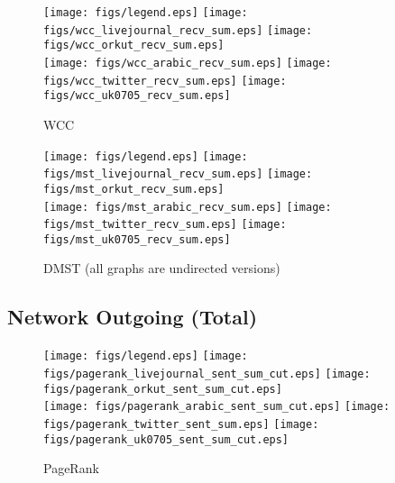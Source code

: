\documentclass{article}
\newcommand{\bline}[1][1]{\vspace{#1\baselineskip}}
\begin{document}
\begin{figure}[!h]
  \bline[3.5]
  \centering
  \texttt{[image: figs/legend.eps]}\hspace{3em}%
  \texttt{[image: figs/wcc\_livejournal\_recv\_sum.eps]}\hspace{1em}%
  \texttt{[image: figs/wcc\_orkut\_recv\_sum.eps]}\\
  \texttt{[image: figs/wcc\_arabic\_recv\_sum.eps]}\hspace{1em}%
  \texttt{[image: figs/wcc\_twitter\_recv\_sum.eps]}\hspace{1em}%
  \texttt{[image: figs/wcc\_uk0705\_recv\_sum.eps]}
  \caption{WCC}
\end{figure}

\begin{figure}[!h]
  \bline[3.5]
  \centering
  \texttt{[image: figs/legend.eps]}\hspace{3em}%
  \texttt{[image: figs/mst\_livejournal\_recv\_sum.eps]}\hspace{1em}%
  \texttt{[image: figs/mst\_orkut\_recv\_sum.eps]}\\
  \texttt{[image: figs/mst\_arabic\_recv\_sum.eps]}\hspace{1em}%
  \texttt{[image: figs/mst\_twitter\_recv\_sum.eps]}\hspace{1em}%
  \texttt{[image: figs/mst\_uk0705\_recv\_sum.eps]}
  \caption{DMST (all graphs are undirected versions)}
\end{figure}

\pagebreak
\subsection{Network Outgoing (Total)}
\begin{figure}[!h]
  \bline[1]
  \centering
  \texttt{[image: figs/legend.eps]}\hspace{3em}%
  \texttt{[image: figs/pagerank\_livejournal\_sent\_sum\_cut.eps]}\hspace{1em}%
  \texttt{[image: figs/pagerank\_orkut\_sent\_sum\_cut.eps]}\\
  \texttt{[image: figs/pagerank\_arabic\_sent\_sum\_cut.eps]}\hspace{1em}%
  \texttt{[image: figs/pagerank\_twitter\_sent\_sum.eps]}\hspace{1em}%
  \texttt{[image: figs/pagerank\_uk0705\_sent\_sum\_cut.eps]}
  \caption{PageRank}
\end{figure}
\end{document}
